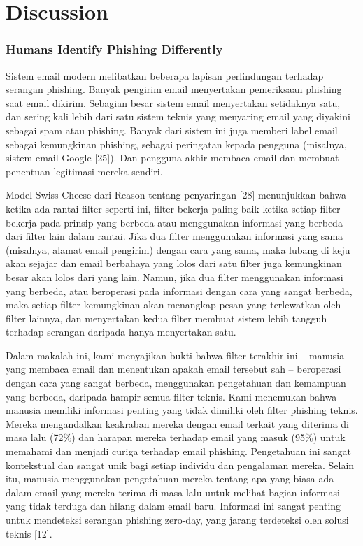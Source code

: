 \documentclass[lettersize,journal]{IEEEtran}
\begin{document}
\section{Discussion}

\subsubsection{Humans Identify Phishing Differently}
Sistem email modern melibatkan beberapa lapisan perlindungan terhadap serangan
phishing. Banyak pengirim email menyertakan pemeriksaan phishing saat email
dikirim. Sebagian besar sistem email menyertakan setidaknya satu, dan sering
kali lebih dari satu sistem teknis yang menyaring email yang diyakini sebagai
spam atau phishing. Banyak dari sistem ini juga memberi label email sebagai
kemungkinan phishing, sebagai peringatan kepada pengguna (misalnya, sistem
email Google [25]). Dan pengguna akhir membaca email dan membuat penentuan
legitimasi mereka sendiri.

Model Swiss Cheese dari Reason tentang penyaringan [28] menunjukkan bahwa
ketika ada rantai filter seperti ini, filter bekerja paling baik ketika setiap
filter bekerja pada prinsip yang berbeda atau menggunakan informasi yang
berbeda dari filter lain dalam rantai. Jika dua filter menggunakan informasi
yang sama (misalnya, alamat email pengirim) dengan cara yang sama, maka lubang
di keju akan sejajar dan email berbahaya yang lolos dari satu filter juga
kemungkinan besar akan lolos dari yang lain. Namun, jika dua filter menggunakan
informasi yang berbeda, atau beroperasi pada informasi dengan cara yang sangat
berbeda, maka setiap filter kemungkinan akan menangkap pesan yang terlewatkan
oleh filter lainnya, dan menyertakan kedua filter membuat sistem lebih tangguh
terhadap serangan daripada hanya menyertakan satu.

Dalam makalah ini, kami menyajikan bukti bahwa filter terakhir ini – manusia
yang membaca email dan menentukan apakah email tersebut sah – beroperasi dengan
cara yang sangat berbeda, menggunakan pengetahuan dan kemampuan yang berbeda,
daripada hampir semua filter teknis. Kami menemukan bahwa manusia memiliki
informasi penting yang tidak dimiliki oleh filter phishing teknis. Mereka
mengandalkan keakraban mereka dengan email terkait yang diterima di masa lalu
(72\%) dan harapan mereka terhadap email yang masuk (95\%) untuk memahami dan
menjadi curiga terhadap email phishing. Pengetahuan ini sangat kontekstual dan
sangat unik bagi setiap individu dan pengalaman mereka. Selain itu, manusia
menggunakan pengetahuan mereka tentang apa yang biasa ada dalam email yang
mereka terima di masa lalu untuk melihat bagian informasi yang tidak terduga
dan hilang dalam email baru. Informasi ini sangat penting untuk mendeteksi
serangan phishing zero-day, yang jarang terdeteksi oleh solusi teknis [12].
\end{document}
